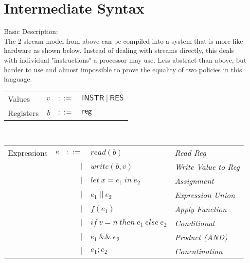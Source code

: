 \documentclass[12pt, letterpaper]{article}
\begin{document}


\section{Intermediate Syntax}


    Basic Description:\\
    The 2-stream model from above can be compiled into a system that is more like hardware as shown below.  Instead of dealing with streams directly, this deals with individual "instructions" a processor may use.  Less abstract than above, but harder to use and almost impossible to prove the equality of two policies in this language.\\

    \begin{tabular}{l r c l}
        Values        & $v$     & $::=$     & $\mathsf{INSTR\ |\ RES}$\\
        Registers     & $b$     & $::=$     & $\mathsf{reg}$
    \end{tabular}\\

    \begin{tabular}{l c r l l}
       Expressions  & $e$    & $::=$  & $read(b)$       & \textit{Read Reg}        \\
                    &        & $\mid$ & $write(b,v)$    & \textit{Write Value to Reg}     \\
                    &        & $\mid$ & $let\ x = e_1\ in\ e_2$ & \textit{Assignment}        \\  
                    &        & $\mid$ & $e_1\ ||\ e_2$    & \textit{Expression Union}        \\
                    &        & $\mid$ & $f(e_1)$        & \textit{Apply Function} \\  
                    &        & $\mid$ & $if\ v = n\ then\ e_1\ else\ e_2$            & \textit{Conditional} \\
                    &        & $\mid$ & $e_1\ \&\&\ e_2$            & \textit{Product (AND)}\\
                    &        & $\mid$ & $e_1 ; e_2$            & \textit{Concatination}
    \end{tabular}\\
\end{document}
